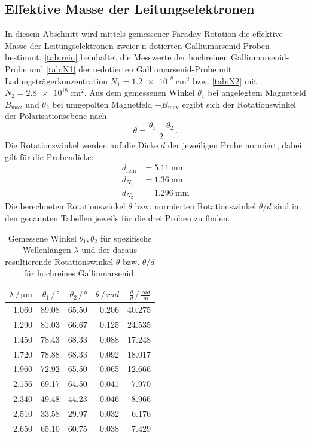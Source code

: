 \subsection{Effektive Masse der Leitungselektronen}
In diesem Abschnitt wird mittels gemessener Faraday-Rotation die effektive Masse der Leitungselektronen zweier n-dotierten Galliumarsenid-Proben bestimmt.
\autoref{tab:rein} beinhaltet die Messwerte der hochreinen Galliumarsenid-Probe und \autoref{tab:N1} der n-dotierten Galliumarsenid-Probe mit Ladungsträgerkonzentration $N_1 = \qty{1.2e18}{\centi\metre^2}$ bzw. \autoref{tab:N2} mit $N_2 = \qty{2.8e18}{\centi\metre^2}$.
Aus dem gemessenen Winkel $\theta_1$ bei angelegtem Magnetfeld $B_\text{max}$ und $\theta_2$ bei umgepolten Magnetfeld $-B_\text{max}$ ergibt sich der Rotationswinkel der Polarisationsebene nach
\begin{equation*}
    \theta = \frac{\theta_1 - \theta_2}{2} \, .
\end{equation*}
Die Rotationswinkel werden auf die Dicke $d$ der jeweiligen Probe normiert, dabei gilt für die Probendicke:
\begin{align}
    d_\text{rein} &= \qty{5.11}{\milli\metre} \\
    d_{N_1} &= \qty{1.36}{\milli\metre} \\
    d_{N_2} &= \qty{1.296}{\milli\metre}
\end{align}
Die berechneten Rotationswinkel $\theta$ bzw. normierten Rotationswinkel $\theta / d$ sind in den genannten Tabellen jeweils für die drei Proben zu finden.\\
\begin{table}
    \centering
    \caption{Gemessene Winkel $\theta_1, \theta_2$ für spezifische Wellenlängen $\lambda$ und der daraus resultierende Rotationswinkel $\theta$ bzw. $\theta/d$ für hochreines Galliumarsenid.}
    \label{tab:rein}
    \begin{tabular}{r r r r r}
        \toprule
        $\lambda \,/\, \unit{\micro\metre}$ & $\theta_1 \,/\, \unit{\degree}$ & $\theta_2 \,/\, \unit{\degree}$ & $\theta \,/\, \unit{rad}$ & $\frac{\theta}{d} \,/\, \frac{rad}{\unit{\metre}}$ \\
        \midrule
        1.060 & 89.08 & 65.50 & 0.206 & 40.275 \\
        1.290 & 81.03 & 66.67 & 0.125 & 24.535 \\
        1.450 & 78.43 & 68.33 & 0.088 & 17.248 \\
        1.720 & 78.88 & 68.33 & 0.092 & 18.017 \\
        1.960 & 72.92 & 65.50 & 0.065 & 12.666 \\
        2.156 & 69.17 & 64.50 & 0.041 & 7.970 \\
        2.340 & 49.48 & 44.23 & 0.046 & 8.966 \\
        2.510 & 33.58 & 29.97 & 0.032 & 6.176 \\
        2.650 & 65.10 & 60.75 & 0.038 & 7.429 \\
        \bottomrule
    \end{tabular}
\end{table}
